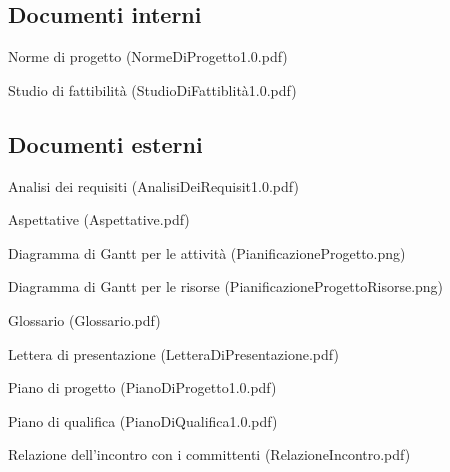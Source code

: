 \subsection{Documenti interni}
\begin{list}{-}{}
\item Norme di progetto (NormeDiProgetto1.0.pdf)
\item Studio di fattibilit\`a (StudioDiFattiblit\`a1.0.pdf)
\end{list}
\subsection{Documenti esterni}
\begin{list}{-}{}
\item Analisi dei requisiti (AnalisiDeiRequisit1.0.pdf)
\item Aspettative (Aspettative.pdf)
\item Diagramma di Gantt per le attivit\`a (PianificazioneProgetto.png)
\item Diagramma di Gantt per le risorse (PianificazioneProgettoRisorse.png)
\item Glossario (Glossario.pdf)
\item Lettera di presentazione (LetteraDiPresentazione.pdf)
\item Piano di progetto (PianoDiProgetto1.0.pdf)
\item Piano di qualifica (PianoDiQualifica1.0.pdf)
\item Relazione dell'incontro con i committenti (RelazioneIncontro.pdf)
\end{list}


